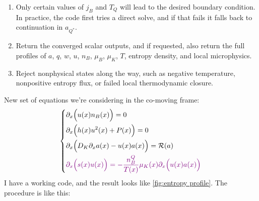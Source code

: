 \documentclass[11pt]{article}
\newcommand{\AHcom}[1]{\textsf{\color{cyan}{\textsuperscript{AH}#1}}}
\newcommand{\JS}[1]{{\color{violet}#1}}
\begin{document}
\begin{enumerate}
\begin{align}
\end{align}
\item Only certain values of $j_B$ and $T_Q$ will lead to the desired boundary condition. In practice, the code first tries a direct solve, and if that fails it falls back to continuation in $a_{Q^\ast}$.
\item Return the converged scalar outputs, and if requested, also return the full profiles of $a$, $q$, $w$, $u$, $n_B$, $\mu_B$, $\mu_K$, $T$, entropy density, and local microphysics.
\item Reject nonphysical states along the way, such as negative temperature, nonpositive entropy flux, or failed local thermodynamic closure.
\end{enumerate}


\iffalse
New set of equations we're considering in the co-moving frame:
\begin{equation}
\left\{
\begin{aligned}
& \partial_x\Big(u(x) n_B(x)\Big) = 0 \\
& \partial_x\Big( h(x)u^2(x) + P(x)\Big) = 0\\
& \partial_x\Big( D_K\partial_x a(x) - u(x)a(x)\Big) = \mathcal{R}(a)\\
& \JS{\partial_x\Big(s(x)u(x)\Big) = -\frac{n_B^Q}{T(x)}\mu_K(x)\partial_x\Big(u(x) a(x)\Big)}
\end{aligned}
\right. \label{old-steady-state}
\end{equation}
I have a working code, and the result looks like \ref{fig:entropy profile}. The procedure is like this:
\end{document}

